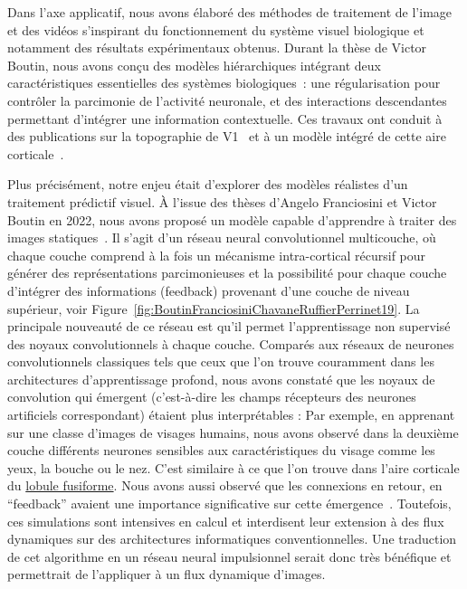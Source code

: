 \documentclass[10pt,french,a4paper]{article}%
\begin{document}
Dans l'axe applicatif, nous avons élaboré des méthodes de traitement de l'image et des vidéos s'inspirant du fonctionnement du système visuel biologique et notamment des résultats expérimentaux obtenus. Durant la thèse de Victor Boutin, nous avons conçu des modèles hiérarchiques intégrant deux caractéristiques essentielles des systèmes biologiques~: une régularisation pour contrôler la parcimonie de l'activité neuronale, et des interactions descendantes permettant d'intégrer une information contextuelle. Ces travaux ont conduit à des publications sur la topographie de V1~\citep{Chavane22} et à un modèle intégré de cette aire corticale~\citep{Franciosini21}.

Plus précisément, notre enjeu était d'explorer des modèles réalistes d'un traitement prédictif visuel. À l'issue des thèses d'Angelo Franciosini et Victor Boutin en 2022, nous avons proposé un modèle capable d'apprendre à traiter des images statiques~\citep{BoutinFranciosiniChavaneRuffierPerrinet20}. Il s'agit d'un réseau neural convolutionnel multicouche, où chaque couche comprend à la fois un mécanisme intra-cortical récursif pour générer des représentations parcimonieuses et la possibilité pour chaque couche d'intégrer des informations (feedback) provenant d'une couche de niveau supérieur, voir Figure~\ref{fig:BoutinFranciosiniChavaneRuffierPerrinet19}. La principale nouveauté de ce réseau est qu'il permet l'apprentissage non supervisé des noyaux convolutionnels à chaque couche. Comparés aux réseaux de neurones convolutionnels classiques tels que ceux que l'on trouve couramment dans les architectures d'apprentissage profond, nous avons constaté que les noyaux de convolution qui émergent (c'est-à-dire les champs récepteurs des neurones artificiels correspondant) étaient plus interprétables : Par exemple, en apprenant sur une classe d'images de visages humains, nous avons observé dans la deuxième couche différents neurones sensibles aux caractéristiques du visage comme les yeux, la bouche ou le nez. C'est similaire à ce que l'on trouve dans l'aire corticale du \href{https://fr.wikipedia.org/wiki/Lobule_fusiforme}{lobule fusiforme}. Nous avons aussi observé que les connexions en retour, en ``feedback'' avaient une importance significative sur cette émergence~\citep{BoutinFranciosiniRuffierPerrinet20feedback}. Toutefois, ces simulations sont intensives en calcul et interdisent leur extension à des flux dynamiques sur des architectures informatiques conventionnelles. Une traduction de cet algorithme en un réseau neural impulsionnel serait donc très bénéfique et permettrait de l'appliquer à un flux dynamique d'images.
\end{document}
